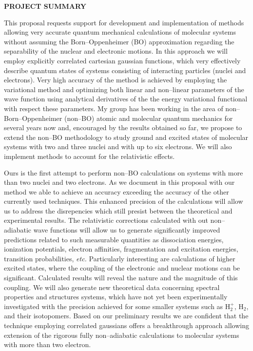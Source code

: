 \setlength{\textwidth}{7in}
\setlength{\textheight}{9.35in}
\setlength{\oddsidemargin}{-.25in}
\setlength{\topmargin}{-.2in}




\setlength{\baselineskip}{1em}


\noindent
{\bf PROJECT SUMMARY}

This proposal requests support for development and implementation
of methods allowing very accurate 
quantum mechanical calculations of molecular systems without
assuming the Born--Oppenheimer (BO) approximation regarding the
separability of the nuclear and electronic motions. In this
approach we will employ explicitly  
correlated cartesian gaussian functions,
which very effectively describe 
quantum states of systems consisting of 
interacting particles (nuclei and electrons).
Very high accuracy of the method is achieved
by employing the variational method and optimizing
both linear and non--linear parameters of the
wave function using analytical derivatives of the
the energy variational functional 
with respect these parameters. 
My group has been working in the area of 
non--Born--Oppenheimer (non--BO)
atomic and molecular quantum mechanics 
for several years now and, encouraged by the 
results obtained so far, we propose to extend
the non--BO methodology 
to study 
ground and excited states of
molecular systems with two and three nuclei and
with up to six electrons.
We will also implement methods to account
for the relativistic effects.
 
Ours is the first attempt to perform
non--BO calculations on systems with
more than two nuclei and two electrons. 
As we document in this proposal 
with our method we able to achieve an accuracy 
exceeding the accuracy of the 
other currently used techniques.
This enhanced precision of the calculations 
will allow us to address the disrepencies which
still presist between the theoretical and experimental results.
The relativistic corrections calculated 
with out non--adiabatic wave functions will
allow us to generate significantly improved
predictions related to such measurable quantities as
dissociation energies, ionization potentials,
electron affinities, fragmentation and excitation
energies, transition probabilities, {\it etc.}
Particularly interesting are calculations of
higher excited states,
where the coupling of the electronic and nuclear motions
can be significant.
Calculated results will reveal 
the nature and the magnitude of this
coupling.
We will also generate new theoretical data
concerning spectral properties and structures systems, 
which have not yet been experimentally investigated
with the precision achieved for some smaller systems such as 
H$_2^+$, H$_2$, and their isotopomers.
Based on our preliminary results we are confident
that the technique employing correlated gaussians
offers a breakthrough approach allowing extension of the
rigorous fully non--adiabatic calculations to molecular
systems with more than two electron. 

